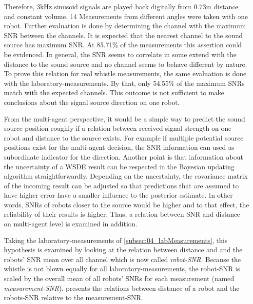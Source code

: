 Therefore, 3\si{\kilo\hertz} sinusoid signals are played back digitally from
0.73\si{\meter} distance and constant volume.
14 Measurements from different angles were taken with one robot.
Further evaluation is done by determining the channel with the maximum
\ac{SNR} between the channels.
It is expected that the nearest channel to the sound source has maximum \ac{SNR}.
At 85.71\si{\percent} of the measurements this assertion could be
evidenced.
In general, the \ac{SNR} seems to correlate in some extend with the
distance to the sound source and no channel seems to behave different
by nature.
To prove this relation for real whistle measurements, the same evaluation is
done with the laboratory-measurements.
By that, only 54.55\si{\percent} of the maximum \acp{SNR} match with the expected
channels.
This outcome is not sufficient to make conclusions about the signal source
direction on one robot.

From the multi-agent perspective, it would be a simple way to predict the sound
source position roughly if a relation between received signal strength on one robot
and distance to the source exists.
For example if multiple potential source positions exist for the multi-agent decision,
the \ac{SNR} information can used as subordinate indicator for the direction.
Another point is that information about the uncertainty of a \ac{WSDE} result
can be respected in the Bayesian updating algorithm straightforwardly.
Depending on the uncertainty, the covariance matrix of the incoming result can
be adjusted so that predictions that are assumed to have higher error have
a smaller influence to the posterior estimate.
In other words, \acp{SNR} of robots closer to the source would be higher
and to that effect, the reliability of their results is higher.
Thus, a relation between \ac{SNR} and distance on multi-agent level is examined in addition.


Taking the laboratory-measurements of \cref{subsec:04_labMeasurements}, this
hypothesis is examined by looking at the relation between distance and and the robots'
\ac{SNR} mean over all channel which is now called \textit{robot-\ac{SNR}}.
Because the whistle is not blown equally for all laboratory-measurements,
the robot-\ac{SNR} is scaled by the overall mean of all robots' \acp{SNR} for each
measurement (named \textit{measurement-\ac{SNR}}).
 presents the relations between distance of a robot
and the robots-\ac{SNR} relative to the measurement-\ac{SNR}.

